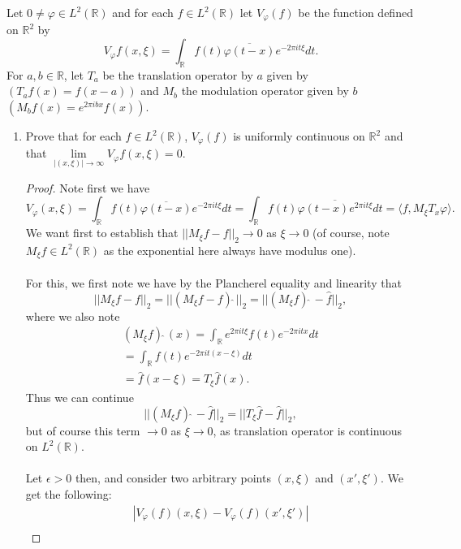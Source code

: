 \documentclass[12pt]{article}
\newenvironment{ex}[2][Exercise]{\begin{trivlist}
\item[\hskip \labelsep {\bfseries #1}\hskip \labelsep {\bfseries #2.}]}{\end{trivlist}}
\begin{document}
\begin{ex}{16}
    Let $0 \neq \varphi \in L^2(\mathbb{R})$ and for each $f \in L^2(\mathbb{R})$ let $V_\varphi(f)$ be the function defined on $\mathbb{R}^2$ by 
    $$V_\varphi f(x, \xi) = \int_{\mathbb{R}} f(t)\overline{\varphi(t - x)}e^{-2\pi i t \xi}dt.$$
    For $a, b \in \mathbb{R}$, let $T_a$ be the translation operator by $a$ given by $(T_af(x) = f(x - a))$ and $M_b$ the modulation operator given by $b$ $(M_bf(x) = e^{2\pi i bx}f(x))$.
    \begin{enumerate}[label=(\alph*)]
        \item Prove that for each $f \in L^2(\mathbb{R})$, $V_\varphi(f)$ is uniformly continuous on $\mathbb{R}^2$ and that $\underset{|(x, \xi)| \rightarrow \infty}{\lim} V_\varphi f(x, \xi) = 0$. 
        \begin{proof}
            Note first we have
            $$V_\varphi(x, \xi) = \int_\mathbb{R} f(t)\overline{\varphi(t - x)}e^{-2\pi i t\xi}dt = \int_{\mathbb{R}} f(t)\overline{\varphi(t - x)e^{2\pi it\xi}}dt = \langle f, M_\xi T_x \varphi \rangle.$$
            We want first to establish that $||M_\xi f - f||_2 \rightarrow 0$ as $\xi \rightarrow 0$ (of course, note $M_\xi f \in L^2(\mathbb{R})$ as the exponential here always have modulus one). \\ \\
            For this, we first note we have by the Plancherel equality and linearity that
            $$||M_\xi f - f||_2 = ||(M_\xi f - f)\hat{\;}||_2 = ||(M_\xi f)\hat{\;} - \hat{f}||_2,$$
            where we also note 
            \begin{align*}
                (M_\xi f)\hat{\;}(x) = \int_\mathbb{R} e^{2\pi it\xi}f(t)e^{-2\pi i tx}dt \\
                = \int_\mathbb{R} f(t)e^{-2\pi i t(x - \xi)}dt \\
                = \hat{f}(x - \xi) = T_\xi\hat{f}(x).
            \end{align*}
            Thus we can continue
            $$||(M_\xi f)\hat{\;} - \hat{f}||_2 = ||T_\xi\hat{f} - \hat{f}||_2,$$
            but of course this term $\rightarrow 0$ as $\xi \rightarrow 0$, as translation operator is continuous on $L^2(\mathbb{R})$. \\ \\
            Let $\epsilon > 0$ then, and consider two arbitrary points $(x, \xi)$ and $(x', \xi')$. We get the following:
            \begin{align*}
                |V_\varphi(f)(x, \xi) - V_\varphi(f)(x', \xi')| \\

\end{align*}
\end{proof}
\end{enumerate}
\end{ex}
\end{document}
